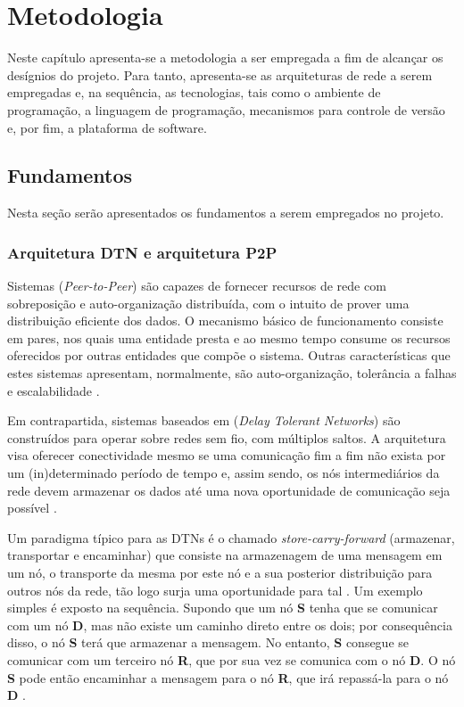 \chapter{Metodologia}\label{cap:metodologia}

Neste capítulo apresenta-se a metodologia a ser empregada a fim de alcançar os desígnios do projeto. Para tanto, apresenta-se as arquiteturas de rede a serem empregadas e, na sequência, as tecnologias, tais como o ambiente de programação, a linguagem de programação, mecanismos para controle de versão e, por fim, a plataforma de software. 

\section{Fundamentos}\label{s:fundamentos}

Nesta seção serão apresentados os fundamentos a serem empregados no projeto.

\subsection{Arquitetura DTN e arquitetura P2P}

Sistemas  (\emph{Peer-to-Peer}) são capazes de fornecer recursos de rede com sobreposição e auto-organização distribuída, com o intuito de prover uma distribuição eficiente dos dados. O mecanismo básico de funcionamento consiste em pares, nos quais uma entidade presta e ao mesmo tempo consume os recursos oferecidos por outras entidades que compõe o sistema. Outras características que estes sistemas apresentam, normalmente, são auto-organização, tolerância a falhas e escalabilidade \cite{italianos}.

Em contrapartida, sistemas baseados em  (\emph{Delay Tolerant Networks}) são construídos para operar sobre redes sem fio, com múltiplos saltos. A arquitetura visa oferecer conectividade mesmo se uma comunicação fim a fim não exista por um (in)determinado período de tempo e, assim sendo, os nós intermediários da rede devem armazenar os dados até uma nova oportunidade de comunicação seja possível \cite{italianos}.

Um paradigma típico para as DTNs é o chamado \emph{store-carry-forward} (armazenar, transportar e encaminhar) que consiste na armazenagem de uma mensagem em um nó, o transporte da mesma por este nó e a sua posterior distribuição para outros nós da rede, tão logo surja uma oportunidade para tal \cite{italianos}. Um exemplo simples é exposto na sequência. Supondo que um nó \textbf{S} tenha que se comunicar com um nó \textbf{D}, mas não existe um caminho direto entre os dois; por consequência disso, o nó \textbf{S} terá que armazenar a mensagem. No entanto, \textbf{S} consegue se comunicar com um terceiro nó \textbf{R}, que por sua vez se comunica com o nó \textbf{D}. O nó \textbf{S} pode então encaminhar a mensagem para o nó \textbf{R}, que irá repassá-la para o nó \textbf{D} \cite{italianos}.

